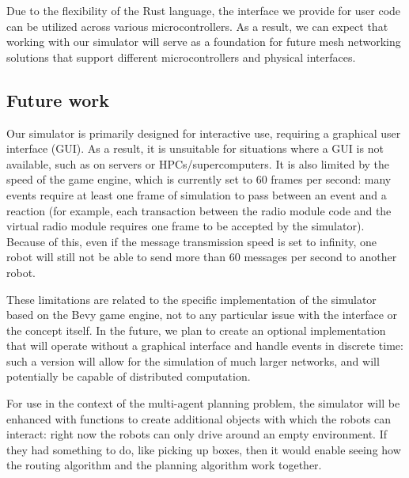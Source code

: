 \documentclass[%
]{article}
\begin{document}
Due to the flexibility of the Rust language,
the interface we provide for user code can be utilized across various microcontrollers.
As a result, we can expect that working with our simulator will serve as
a foundation for future mesh networking solutions that support different microcontrollers and physical interfaces.

\subsection{Future work}

Our simulator is primarily designed for interactive use, requiring a graphical user interface (GUI).
As a result, it is unsuitable for situations where a GUI is not available, such as on servers or HPCs/supercomputers.
It is also limited by the speed of the game engine, which is currently set to 60 frames per second:
many events require at least one frame of simulation
to pass between an event and a reaction
(for example, each transaction between the radio module code and
the virtual radio module requires one frame to be accepted by the simulator).
Because of this, even if the message transmission speed is set to infinity,
one robot will still not be able to send more than 60 messages per second to another robot.

These limitations are related to the specific implementation of the
simulator based on the Bevy game engine,
not to any particular issue with the interface or the concept itself.
In the future, we plan to create an optional implementation that will operate
without a graphical interface and handle events in discrete time:
such a version will allow for the simulation of much larger networks,
and will potentially be capable of distributed computation.

For use in the context of the multi-agent planning problem,
the simulator will be enhanced with functions to create additional objects
with which the robots can interact:
right now the robots can only drive around an empty environment.
If they had something to do, like picking up boxes,
then it would enable seeing how the routing algorithm and the planning algorithm work together.



\end{document}
